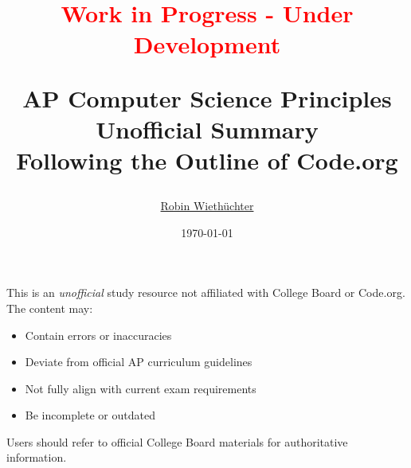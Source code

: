 \documentclass[11pt,oneside]{book}
\title{
    \normalsize\textcolor{red}{Work in Progress - Under Development}

    \Huge AP Computer Science Principles\\[0.5em]

    \Huge Unofficial Summary\\[0.2em]
    
    \Large Following the Outline of Code.org\\[0.5em]
}
\author{\href{https://rowi.dev/}{Robin Wiethüchter}}
\date{\today}
\begin{document}
\maketitle

\begin{tcolorbox}[
    title=Disclaimer,
    colback=white,
    colframe=black,
    width=\textwidth-2cm,
    center
]
This is an \textit{unofficial} study resource not affiliated with College Board\textsuperscript{\textregistered} or Code.org\textsuperscript{\textregistered}. The content may:
\begin{itemize}[leftmargin=*,noitemsep]
    \item Contain errors or inaccuracies
    \item Deviate from official AP\textsuperscript{\textregistered} curriculum guidelines
    \item Not fully align with current exam requirements
    \item Be incomplete or outdated
\end{itemize}
Users should refer to official College Board\textsuperscript{\textregistered} materials for authoritative information.
\end{tcolorbox}

\tableofcontents



% 
% 
% 
% 
% 
% 
% 
% 

% 
% 
\end{document}
